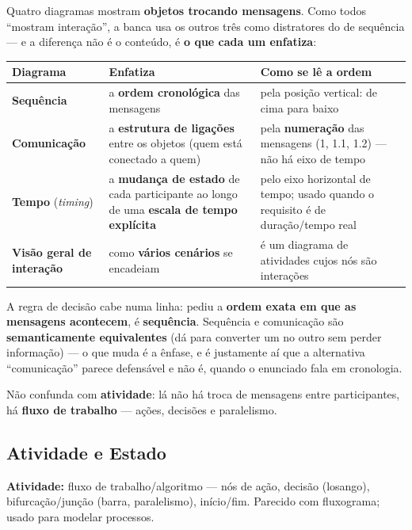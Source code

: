 \begin{conceito}
Quatro diagramas mostram \textbf{objetos trocando mensagens}. Como todos
``mostram interação'', a banca usa os outros três como distratores do de
sequência --- e a diferença não é o conteúdo, é \textbf{o que cada um
enfatiza}:

\begin{center}
\begin{tabular}{@{}p{3.2cm}p{4.2cm}p{4.2cm}@{}}
\toprule
\textbf{Diagrama} & \textbf{Enfatiza} & \textbf{Como se lê a ordem} \\
\midrule
\textbf{Sequência} & a \textbf{ordem cronológica} das mensagens & pela posição
vertical: de cima para baixo \\
\textbf{Comunicação} & a \textbf{estrutura de ligações} entre os objetos (quem
está conectado a quem) & pela \textbf{numeração} das mensagens (1, 1.1,
1.2) --- não há eixo de tempo \\
\textbf{Tempo} (\emph{timing}) & a \textbf{mudança de estado} de cada
participante ao longo de uma \textbf{escala de tempo explícita} & pelo eixo
horizontal de tempo; usado quando o requisito é de duração/tempo real \\
\textbf{Visão geral de interação} & como \textbf{vários cenários} se encadeiam
& é um diagrama de atividades cujos nós são interações \\
\bottomrule
\end{tabular}
\end{center}

A regra de decisão cabe numa linha: pediu a \textbf{ordem exata em que as
mensagens acontecem}, é \textbf{sequência}. Sequência e comunicação são
\textbf{semanticamente equivalentes} (dá para converter um no outro sem perder
informação) --- o que muda é a ênfase, e é justamente aí que a alternativa
``comunicação'' parece defensável e não é, quando o enunciado fala em
cronologia.

Não confunda com \textbf{atividade}: lá não há troca de mensagens entre
participantes, há \textbf{fluxo de trabalho} --- ações, decisões e paralelismo.
\end{conceito}

\subsection{Atividade e Estado}

\textbf{Atividade:} fluxo de trabalho/algoritmo --- nós de ação, decisão
(losango), bifurcação/junção (barra, paralelismo), início/fim. Parecido com
fluxograma; usado para modelar processos.

